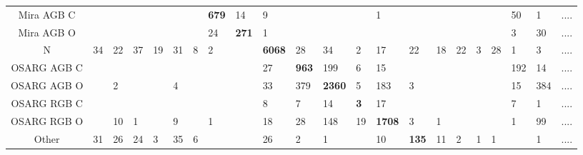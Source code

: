 \begin{landscape}
{\begin{tabular}{c|C{1cm}C{1cm}C{1cm}C{1cm}C{1cm}C{1cm}C{1cm}C{1cm}C{1cm}C{1cm}C{1cm}C{1cm}C{1cm}C{1cm}C{1cm}C{1cm}C{1cm}C{1cm}C{1cm}C{1cm}|c}
Mira AGB C         &          &         &           &          &          &          &     \bfseries 679      &      14      &    9      &               &               &               &        1      &         &           &          &         &         &     50      &      1      & .... \\
Mira AGB O         &          &         &           &          &          &          &      24      &     \bfseries 271      &    1      &               &               &               &               &         &           &          &         &         &      3      &     30      & .... \\
N                  &  34      &  22     &   37      &  19      &  31      &    8     &       2      &              & \bfseries 6068      &       28      &       34      &        2      &       17      &  22     &   18      &  22      &  3      & 28      &      1      &      3      & .... \\
OSARG AGB C        &          &         &           &          &          &          &              &              &   27      &      \bfseries 963      &      199      &        6      &       15      &         &           &          &         &         &    192      &     14      & .... \\
OSARG AGB O        &          &   2     &           &          &   4      &          &              &              &   33      &      379      &     \bfseries 2360      &        5      &      183      &   3     &           &          &         &         &     15      &    384      & .... \\
OSARG RGB C        &          &         &           &          &          &          &              &              &    8      &        7      &       14      &        \bfseries 3      &       17      &         &           &          &         &         &      7      &      1      & .... \\
OSARG RGB O        &          &  10     &    1      &          &   9      &          &       1      &              &   18      &       28      &      148      &       19      &     \bfseries 1708      &   3     &    1      &          &         &         &      1      &     99      & .... \\
Other              &  31      &  26     &   24      &   3      &  35      &    6     &              &              &   26      &        2      &        1      &               &       10      & \bfseries 135     &   11      &   2      &  1      &  1      &             &      1      & .... \\

\end{tabular}}
\end{landscape}
